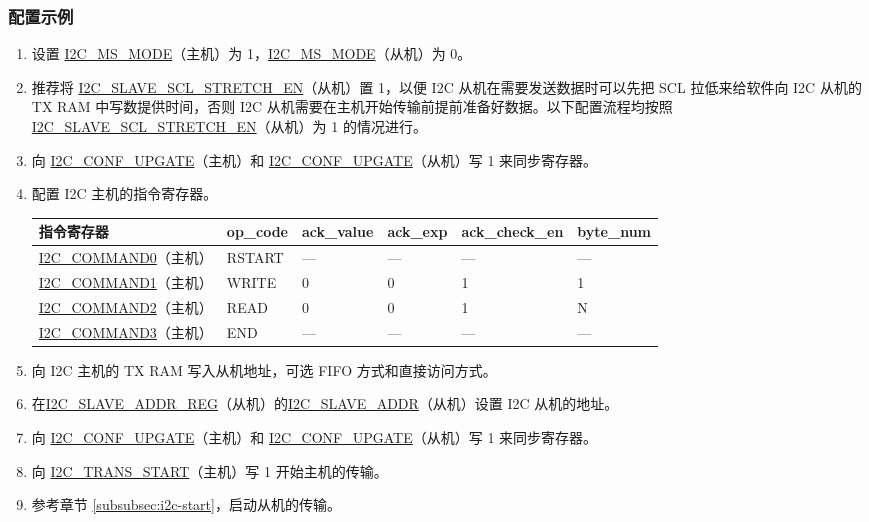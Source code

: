 \documentclass[main\_\_CN.tex]{subfiles}
\begin{document}
\subsubsection{配置示例}
\begin{enumerate}
\item 设置 \hyperref[fielddesc:I2CMSMODE]{I2C\_MS\_MODE}（主机）为 1，\hyperref[fielddesc:I2CMSMODE]{I2C\_MS\_MODE}（从机）为 0。
\item 推荐将 \hyperref[fielddesc:I2CSLAVESCLSTRETCHEN]{I2C\_SLAVE\_SCL\_STRETCH\_EN}（从机）置 1，以便 I2C 从机在需要发送数据时可以先把 SCL 拉低来给软件向 I2C 从机的 TX RAM 中写数提供时间，否则 I2C 从机需要在主机开始传输前提前准备好数据。以下配置流程均按照\hyperref[fielddesc:I2CSLAVESCLSTRETCHEN]{I2C\_SLAVE\_SCL\_STRETCH\_EN}（从机）为 1 的情况进行。
\item 向 \hyperref[fielddesc:I2CCONFUPGATE]{I2C\_CONF\_UPGATE}（主机）和 \hyperref[fielddesc:I2CCONFUPGATE]{I2C\_CONF\_UPGATE}（从机）写 1 来同步寄存器。
\item 配置 I2C 主机的指令寄存器。
\begin{longtable}{ | p{4cm} | p{2cm} | p{2cm} | p{2cm} |p{2cm} | p{2cm} |}
\hline\rowcolor{lightgray}
指令寄存器& op\_code & ack\_value&ack\_exp&ack\_check\_en&byte\_num  \\ \hline
\hyperref[fielddesc:I2CCOMMAND0]{I2C\_COMMAND0}（主机）& RSTART& ---&---&---&---  \\ \hline
\hyperref[fielddesc:I2CCOMMAND1]{I2C\_COMMAND1}（主机）& WRITE& 0&0&1&1  \\ \hline
\hyperref[fielddesc:I2CCOMMAND2]{I2C\_COMMAND2}（主机）& READ& 0&0&1&N  \\ \hline
\hyperref[fielddesc:I2CCOMMAND3]{I2C\_COMMAND3}（主机）& END& ---&---&---&---  \\ \hline
\end{longtable}
\item 向 I2C 主机的 TX RAM 写入从机地址，可选 FIFO 方式和直接访问方式。
\item 在\hyperref[regdesc:I2CSLAVEADDRREG]{I2C\_SLAVE\_ADDR\_REG}（从机）的\hyperref[fielddesc:I2CSLAVEADDR]{I2C\_SLAVE\_ADDR}（从机）设置 I2C 从机的地址。
\item 向 \hyperref[fielddesc:I2CCONFUPGATE]{I2C\_CONF\_UPGATE}（主机）和 \hyperref[fielddesc:I2CCONFUPGATE]{I2C\_CONF\_UPGATE}（从机）写 1 来同步寄存器。
\item 向 \hyperref[fielddesc:I2CTRANSSTART]{I2C\_TRANS\_START}（主机）写 1 开始主机的传输。
\item 参考章节 \ref{subsubsec:i2c-start}，启动从机的传输。

\end{enumerate}
\end{document}
